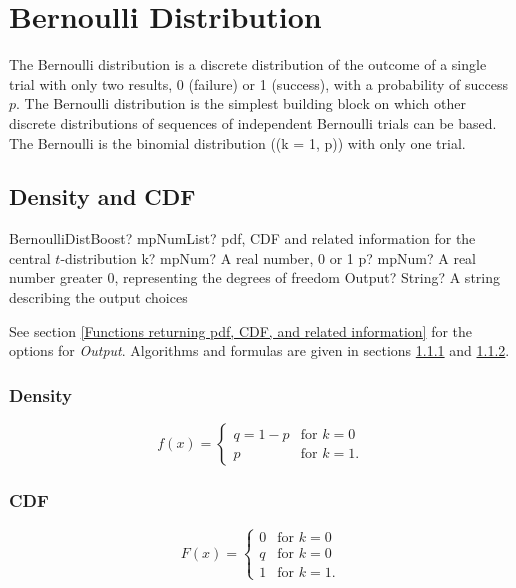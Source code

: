 \newpage
\section{Bernoulli Distribution}

The Bernoulli distribution is a discrete distribution of the outcome of a single trial with only two results, 0 (failure) or 1 (success), with a probability of success $p$. The Bernoulli distribution is the simplest building block on which other discrete distributions of sequences of independent Bernoulli trials can be based. The Bernoulli is the binomial distribution ((k = 1, p)) with only one trial.



\subsection{Density and CDF}

\begin{mpFunctionsExtract}
	\mpFunctionThreeNotImplemented
	{BernoulliDistBoost? mpNumList? pdf, CDF and related information for the central $t$-distribution}
	{k? mpNum? A real number, 0 or 1}
	{p? mpNum? A real number greater 0, representing the degrees of freedom}
	{Output? String? A string describing the output choices}
\end{mpFunctionsExtract}


\vspace{0.3cm}
See section \ref{Functions returning pdf, CDF, and related information} for the options for {\itshape\sffamily Output}. Algorithms and formulas are given in sections \ref{BernoulliDistributionDensity} and \ref{BernoulliDistributionCDF}.



\subsubsection{Density}
\label{BernoulliDistributionDensity}


\begin{equation}
	f(x)=\begin{cases}
		q=1-p & \text{for }k=0\\
		p & \text{for }k=1.
	\end{cases}
\end{equation}

\subsubsection{CDF}
\label{BernoulliDistributionCDF}
\begin{equation}
	F(x)=\begin{cases}
		0 & \text{for }k=0\\
		q & \text{for }k=0\\
		1 & \text{for }k=1.
	\end{cases}
\end{equation}




